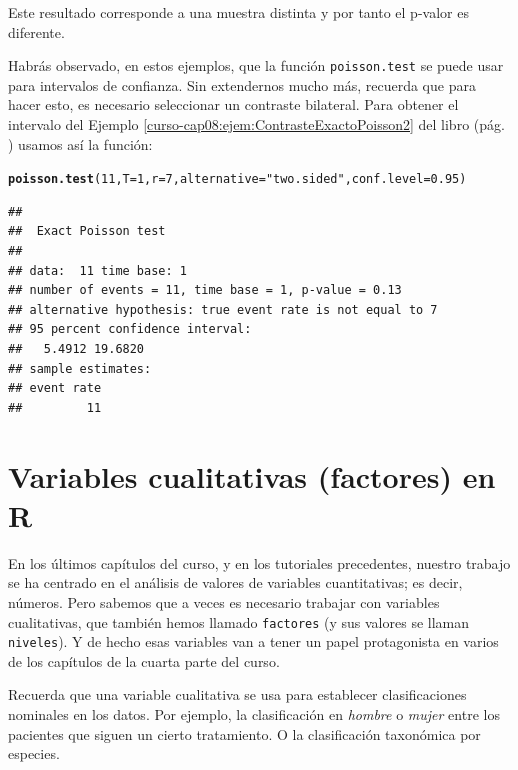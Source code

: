 \documentclass[10pt,a4paper]{article}\usepackage[]{graphicx}\usepackage[]{color}
\makeatletter
\newcommand{\hlnum}[1]{\textcolor[rgb]{0.686,0.059,0.569}{#1}}%
\newcommand{\hlstr}[1]{\textcolor[rgb]{0.192,0.494,0.8}{#1}}%
\newcommand{\hlstd}[1]{\textcolor[rgb]{0.345,0.345,0.345}{#1}}%
\newcommand{\hlkwc}[1]{\textcolor[rgb]{0.333,0.667,0.333}{#1}}%
\newcommand{\hlkwd}[1]{\textcolor[rgb]{0.737,0.353,0.396}{\textbf{#1}}}%
\newenvironment{kframe}{%
 \def\at@end@of@kframe{}%
 \ifinner\ifhmode%
  \def\at@end@of@kframe{\end{minipage}}%
  \begin{minipage}{\columnwidth}%
 \fi\fi%
 \def\FrameCommand##1{\hskip\@totalleftmargin \hskip-\fboxsep
 \colorbox{shadecolor}{##1}\hskip-\fboxsep
     \hskip-\linewidth \hskip-\@totalleftmargin \hskip\columnwidth}%
 \MakeFramed {\advance\hsize-\width
   \@totalleftmargin\z@ \linewidth\hsize
   \@setminipage}}%
 {\par\unskip\endMakeFramed%
 \at@end@of@kframe}
\newenvironment{knitrout}{}{} %
\newcounter {cont01}
\makeatother
\begin{document}
Este resultado corresponde a una muestra distinta y por tanto el p-valor es diferente.


Habrás observado, en estos ejemplos, que la función {\tt poisson.test} se puede usar para intervalos de confianza. Sin extendernos mucho más, recuerda que para hacer esto, es necesario seleccionar un contraste bilateral. Para obtener el intervalo del Ejemplo \ref{curso-cap08:ejem:ContrasteExactoPoisson2} del libro (pág. \pageref{curso-cap08:ejem:ContrasteExactoPoisson2}) usamos así la función:

\begin{knitrout}
\color{fgcolor}\begin{kframe}
\begin{alltt}
\hlkwd{poisson.test}\hlstd{(}\hlnum{11}\hlstd{,} \hlkwc{T}\hlstd{=}\hlnum{1}\hlstd{,} \hlkwc{r}\hlstd{=}\hlnum{7}\hlstd{,} \hlkwc{alternative}\hlstd{=}\hlstr{"two.sided"}\hlstd{,} \hlkwc{conf.level}\hlstd{=}\hlnum{0.95}\hlstd{)}
\end{alltt}
\begin{verbatim}
## 
## 	Exact Poisson test
## 
## data:  11 time base: 1
## number of events = 11, time base = 1, p-value = 0.13
## alternative hypothesis: true event rate is not equal to 7
## 95 percent confidence interval:
##   5.4912 19.6820
## sample estimates:
## event rate 
##         11
\end{verbatim}
\end{kframe}
\end{knitrout}

\section{Variables cualitativas (factores) en R}
\label{tut08:sec:FactoresR}

En los últimos capítulos del curso, y en los tutoriales precedentes, nuestro trabajo se ha centrado en el análisis de valores de variables cuantitativas; es decir, números. Pero sabemos que a veces es necesario trabajar con variables cualitativas, que también hemos llamado {\tt factores} (y sus valores se llaman {\tt niveles}). Y de hecho esas variables van a tener un papel protagonista en varios de los capítulos de la cuarta parte del curso.

Recuerda que una variable cualitativa se usa para establecer clasificaciones nominales en los datos. Por ejemplo, la clasificación en {\em hombre} o {\em mujer} entre los pacientes que siguen un cierto tratamiento. O la clasificación taxonómica por especies.
\end{document}

